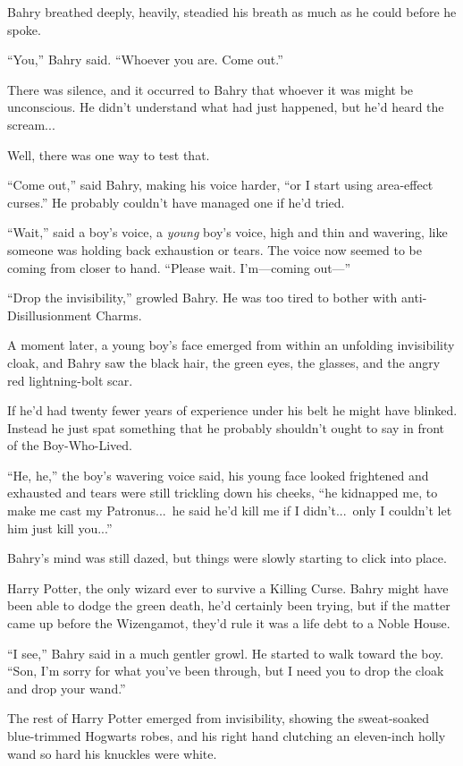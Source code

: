 Bahry breathed deeply, heavily, steadied his breath as much as he could before he spoke.

“You,” Bahry said. “Whoever you are. Come out.”

There was silence, and it occurred to Bahry that whoever it was might be unconscious. He didn’t understand what had just happened, but he’d heard the scream...

Well, there was one way to test that.

“Come out,” said Bahry, making his voice harder, “or I start using area-effect curses.” He probably couldn’t have managed one if he’d tried.

“Wait,” said a boy’s voice, a \emph{young} boy’s voice, high and thin and wavering, like someone was holding back exhaustion or tears. The voice now seemed to be coming from closer to hand. “Please wait. I’m—coming out—”

“Drop the invisibility,” growled Bahry. He was too tired to bother with anti-Disillusionment Charms.

A moment later, a young boy’s face emerged from within an unfolding invisibility cloak, and Bahry saw the black hair, the green eyes, the glasses, and the angry red lightning-bolt scar.

If he’d had twenty fewer years of experience under his belt he might have blinked. Instead he just spat something that he probably shouldn’t ought to say in front of the Boy-Who-Lived.

“He, he,” the boy’s wavering voice said, his young face looked frightened and exhausted and tears were still trickling down his cheeks, “he kidnapped me, to make me cast my Patronus...\ he said he’d kill me if I didn’t...\ only I couldn’t let him just kill you...”

Bahry’s mind was still dazed, but things were slowly starting to click into place.

Harry Potter, the only wizard ever to survive a Killing Curse. Bahry might have been able to dodge the green death, he’d certainly been trying, but if the matter came up before the Wizengamot, they’d rule it was a life debt to a Noble House.

“I see,” Bahry said in a much gentler growl. He started to walk toward the boy. “Son, I’m sorry for what you’ve been through, but I need you to drop the cloak and drop your wand.”

The rest of Harry Potter emerged from invisibility, showing the sweat-soaked blue-trimmed Hogwarts robes, and his right hand clutching an eleven-inch holly wand so hard his knuckles were white.

